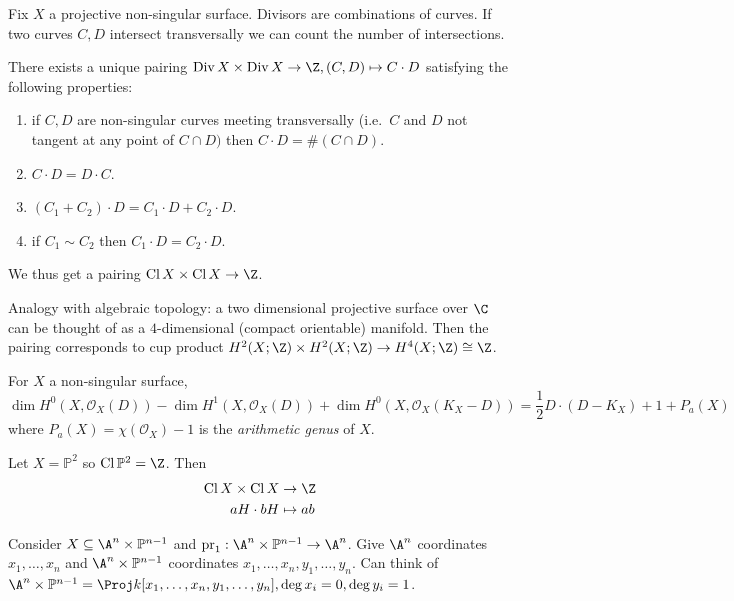\documentclass[a4paper]{article}
\renewcommand*{\P}{\mathbb{P}}
\newcommand{\sh}[1]{\mathcal{#1}} %
\DeclareMathOperator{\Div}{Div} %
\DeclareMathOperator{\Cl}{Cl} %
\begin{document}
Fix \(X\) a projective non-singular surface. Divisors are combinations of curves. If two curves \(C, D\) intersect transversally we can count the number of intersections.

\begin{theorem}
  There exists a unique pairing \(\Div X \times \Div X \to \Z, (C, D) \mapsto C \cdot D\) satisfying the following properties:
  \begin{enumerate}
  \item if \(C, D\) are non-singular curves meeting transversally (i.e.\ \(C\) and \(D\) not tangent at any point of \(C \cap D)\) then \(C \cdot D = \#(C \cap D)\).
  \item \(C \cdot D = D \cdot C\).
  \item \((C_1 + C_2) \cdot D = C_1 \cdot D + C_2 \cdot D\). 
  \item if \(C_1 \sim C_2\) then \(C_1 \cdot D = C_2 \cdot D\).
  \end{enumerate}
  We thus get a pairing \(\Cl X \times \Cl X \to \Z\).
\end{theorem}

Analogy with algebraic topology: a two dimensional projective surface over \(\C\) can be thought of as a \(4\)-dimensional (compact orientable) manifold. Then the pairing corresponds to cup product \(H^2(X; \Z) \times H^2(X; \Z) \to H^4(X; \Z) \cong \Z\).

\begin{theorem}
  For \(X\) a non-singular surface,
  \[
    \dim H^0(X, \sh O_X(D)) - \dim H^1(X, \sh O_X(D)) + \dim H^0(X, \sh O_X(K_X - D))
    = \frac{1}{2} D \cdot (D - K_X) + 1 + P_a(X)
  \]
  where \(P_a(X) = \chi(\sh O_X) - 1\) is the \emph{arithmetic genus} of \(X\).
\end{theorem}

\begin{eg}
  Let \(X = \P^2\) so \(\Cl \P^2 = \Z\). Then
  \begin{align*}
    \Cl X \times \Cl X &\to \Z \\
    aH \cdot bH &\mapsto ab
  \end{align*}
\end{eg}

Consider \(X \subseteq \A^n \times \P^{n - 1}\) and \(\mathrm{pr}_1: \A^n \times \P^{n - 1} \to \A^n\). Give \(\A^n\) coordinates \(x_1, \dots, x_n\) and \(\A^n \times \P^{n - 1}\) coordinates \(x_1, \dots, x_n, y_1, \dots, y_n\). Can think of \(\A^n \times \P^{n - 1} = \Proj k[x_1, \dots, x_n, y_1, \dots, y_n], \deg x_i = 0, \deg y_i = 1\).
\end{document}
